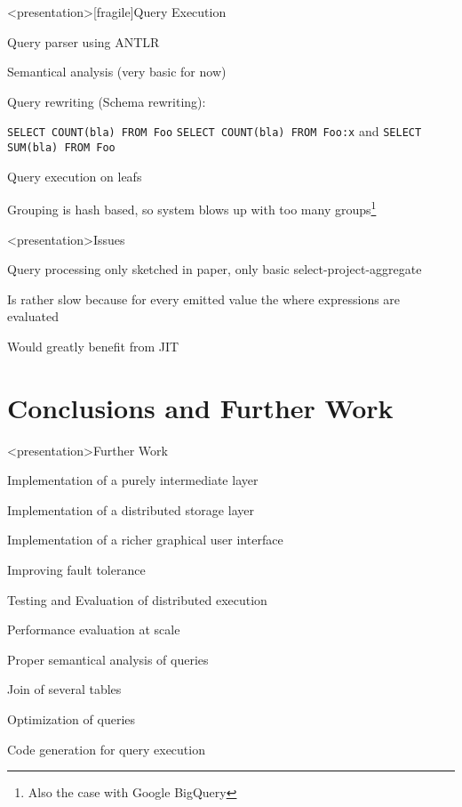 \begin{frame}<presentation>[fragile]{Query Execution}
\begin{niitemize}
 \item Query parser using ANTLR
 \item Semantical analysis (very basic for now)
 \item Query rewriting (Schema rewriting):
   \begin{niitemize}
     \item \verb#SELECT COUNT(bla) FROM Foo# \ra{} \verb#SELECT COUNT(bla) FROM Foo:x# and
       \verb#SELECT SUM(bla) FROM Foo#
   \end{niitemize}
 \item Query execution on leafs
 \item Grouping is hash based, so system blows up with too many groups\footnote{Also the case with Google BigQuery}
\end{niitemize}
\end{frame}

\begin{frame}<presentation>{Issues}
\begin{niitemize}
 \item Query processing only sketched in paper, only basic
  select-project-aggregate
 \item Is rather slow because for every emitted value the where expressions
  are evaluated
 \item Would greatly benefit from JIT
\end{niitemize}
\end{frame}


\section{Conclusions and Further Work}
\begin{frame}<presentation>{Further Work}
\begin{niitemize}
  \item Implementation of a purely intermediate layer
  \item Implementation of a distributed storage layer
  \item Implementation of a richer graphical user interface
  \item Improving fault tolerance
  \item Testing and Evaluation of distributed execution
  \item Performance evaluation at scale
  \item Proper semantical analysis of queries
  \item Join of several tables
  \item Optimization of queries
  \item Code generation for query execution
\end{niitemize}
\end{frame}


